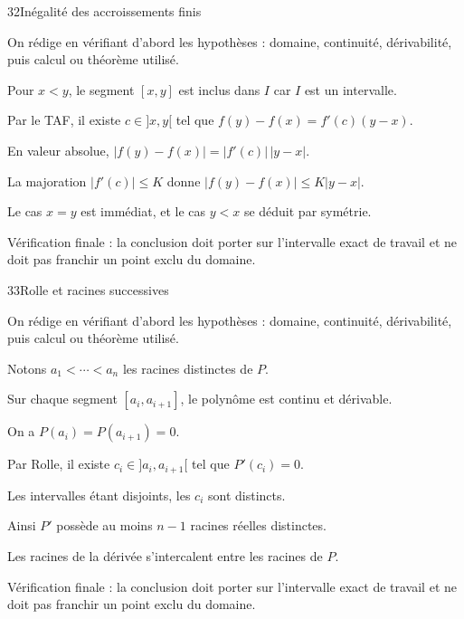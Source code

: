 \documentclass[11pt,a4paper]{article}
\begin{document}
\begin{corrbox}{32}{Inégalité des accroissements finis}

\begin{methodebox}
On rédige en vérifiant d'abord les hypothèses : domaine, continuité, dérivabilité, puis calcul ou théorème utilisé.
\end{methodebox}

Pour $x<y$, le segment $[x,y]$ est inclus dans $I$ car $I$ est un intervalle.


Par le TAF, il existe $c\in]x,y[$ tel que $f(y)-f(x)=f'(c)(y-x)$.


En valeur absolue, $|f(y)-f(x)|=|f'(c)|\,|y-x|$.


La majoration $|f'(c)|\le K$ donne $|f(y)-f(x)|\le K|y-x|$.


Le cas $x=y$ est immédiat, et le cas $y<x$ se déduit par symétrie.


\begin{attentionbox}
Vérification finale : la conclusion doit porter sur l'intervalle exact de travail et ne doit pas franchir un point exclu du domaine.
\end{attentionbox}

\end{corrbox}


\begin{corrbox}{33}{Rolle et racines successives}

\begin{methodebox}
On rédige en vérifiant d'abord les hypothèses : domaine, continuité, dérivabilité, puis calcul ou théorème utilisé.
\end{methodebox}

Notons $a_1<\cdots<a_n$ les racines distinctes de $P$.


Sur chaque segment $[a_i,a_{i+1}]$, le polynôme est continu et dérivable.


On a $P(a_i)=P(a_{i+1})=0$.


Par Rolle, il existe $c_i\in]a_i,a_{i+1}[$ tel que $P'(c_i)=0$.


Les intervalles étant disjoints, les $c_i$ sont distincts.


Ainsi $P'$ possède au moins $n-1$ racines réelles distinctes.


Les racines de la dérivée s'intercalent entre les racines de $P$.


\begin{attentionbox}
Vérification finale : la conclusion doit porter sur l'intervalle exact de travail et ne doit pas franchir un point exclu du domaine.
\end{attentionbox}

\end{corrbox}
\end{document}
